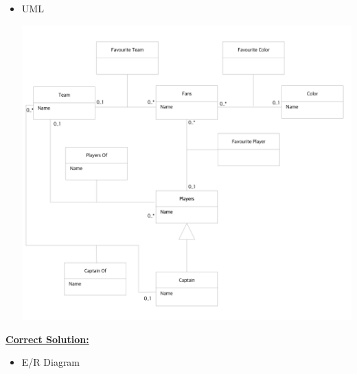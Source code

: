 \documentclass[12pt]{article}
\begin{document}
\begin{enumerate}[1.]
\begin{itemize}
        \item UML

        \begin{center}
        \includegraphics[width=\linewidth]{images/worksheet_15_solution_14.png}
        \end{center}
    \end{itemize}

    \bigskip

    \begin{mdframed}
        \underline{\textbf{Correct Solution:}}

        \bigskip

        \begin{itemize}
            \item E/R Diagram


\end{itemize}
\end{mdframed}
\end{enumerate}
\end{document}
